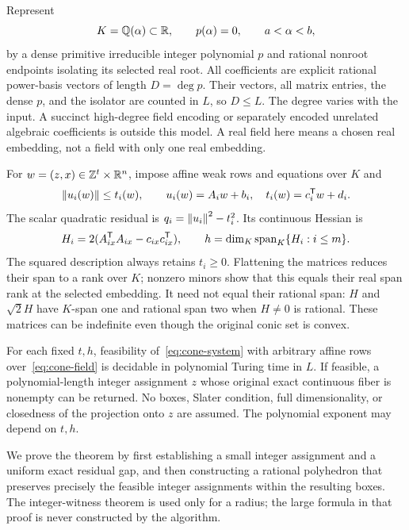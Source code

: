 Represent
\begin{equation}
\label{eq:cone-field}
 K=\mathbb Q(\alpha)\subset\mathbb R,\qquad p(\alpha)=0,\qquad a<\alpha<b,
\end{equation}
by a dense primitive irreducible integer polynomial $p$ and rational
nonroot endpoints isolating its selected real root. All coefficients are
explicit rational power-basis vectors of length $D=\deg p$. Their
vectors, all matrix entries, the dense $p$, and the isolator are counted
in $L$, so $D\le L$. The degree varies with the input. A succinct
high-degree field encoding or separately encoded unrelated algebraic
coefficients is outside this model. A real field here means a chosen real
embedding, not a field with only one real embedding.

For $w=(z,x)\in\mathbb Z^t\times\mathbb R^n$, impose affine weak rows and equations
over $K$ and
\begin{equation}
\label{eq:cone-system}
 \left\lVert u_i(w)\right\rVert\le t_i(w),\qquad
 u_i(w)=A_iw+b_i,\quad t_i(w)=c_i^{\mathsf T}w+d_i.
\end{equation}
The scalar quadratic residual is
$q_i=\left\lVert u_i\right\rVert^2-t_i^2$. Its continuous Hessian is
\begin{equation}
\label{eq:cone-span}
 H_i=2(A_{ix}^{\mathsf T}A_{ix}-c_{ix}c_{ix}^{\mathsf T}),
 \qquad h=\dim_K\operatorname{span}_K\{H_i:i\le m\}.
\end{equation}
The squared description always retains $t_i\ge0$. Flattening the
matrices reduces their span to a rank over $K$; nonzero minors show that
this equals their real span rank at the selected embedding. It need not
equal their rational span: $H$ and $\sqrt2H$ have $K$-span one and
rational span two when $H\ne0$ is rational. These matrices can be
indefinite even though the original conic set is convex.

\begin{theorem}
\label{thm:cone-feasibility}
For each fixed $t,h$, feasibility of~\eqref{eq:cone-system} with
arbitrary affine rows over~\eqref{eq:cone-field} is decidable in
polynomial Turing time in $L$. If feasible, a polynomial-length integer
assignment $z$ whose original exact continuous fiber is nonempty can be
returned. No boxes, Slater condition, full dimensionality, or closedness
of the projection onto $z$ are assumed. The polynomial exponent may
depend on $t,h$.
\end{theorem}

We prove the theorem by first establishing a small integer assignment and
a uniform exact residual gap, and then constructing a rational polyhedron
that preserves precisely the feasible integer assignments within the
resulting boxes. The integer-witness theorem is used only for a radius;
the large formula in that proof is never constructed by the algorithm.

